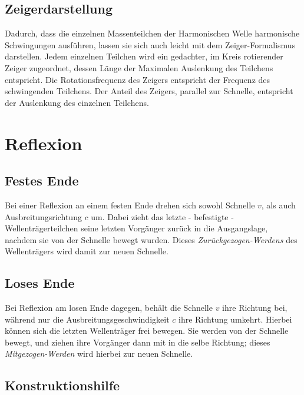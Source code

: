 			\section{Zeigerdarstellung}
			\label{sss_zeigerdarstellung}

Dadurch, dass die einzelnen Massenteilchen der Harmonischen Welle harmonische Schwingungen ausführen, lassen sie sich auch leicht mit dem Zeiger-Formalismus darstellen. Jedem einzelnen Teilchen wird ein gedachter, im Kreis rotierender Zeiger zugeordnet, dessen Länge der Maximalen Auslenkung des Teilchens entspricht. Die Rotationsfrequenz des Zeigers entspricht der Frequenz des schwingenden Teilchens. Der Anteil des Zeigers, parallel zur Schnelle, entspricht der Auslenkung des einzelnen Teilchens.






		\chapter{Reflexion}
		
		
				\section{Festes Ende}


Bei einer Reflexion an einem festen Ende drehen sich sowohl Schnelle \(v\), als auch Ausbreitungsrichtung \(c\) um. Dabei zieht das letzte - befestigte - Wellenträgerteilchen seine letzten Vorgänger zurück in die Ausgangslage, nachdem sie von der Schnelle bewegt wurden. Dieses \textit{Zurückgezogen-Werdens} des Wellenträgers wird damit zur neuen Schnelle.
				
				\section{Loses Ende}

Bei Reflexion am losen Ende dagegen, behält die Schnelle \(v\) ihre Richtung bei, während nur die Ausbreitungsgeschwindigkeit \(c\) ihre Richtung umkehrt. Hierbei können sich die letzten Wellenträger frei bewegen. Sie werden von der Schnelle bewegt, und ziehen ihre Vorgänger dann mit in die selbe Richtung; dieses \textit{Mitgezogen-Werden} wird hierbei zur neuen Schnelle.


				\section{Konstruktionshilfe}
				
